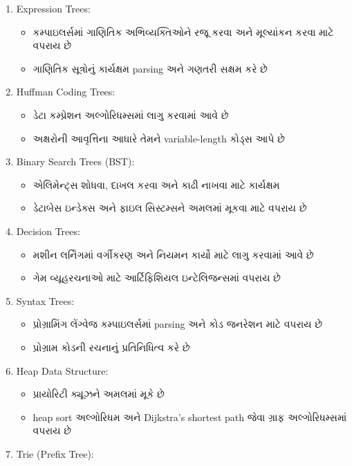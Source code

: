 \begin{enumerate}
\def\labelenumi{\arabic{enumi}.}
\tightlist
\item
  Expression Trees:

  \begin{itemize}
  \tightlist
  \item
    કમ્પાઇલર્સમાં ગાણિતિક અભિવ્યક્તિઓને રજૂ કરવા અને મૂલ્યાંકન કરવા માટે વપરાય છે
  \item
    ગાણિતિક સૂત્રોનું કાર્યક્ષમ parsing અને ગણતરી સક્ષમ કરે છે
  \end{itemize}
\item
  Huffman Coding Trees:

  \begin{itemize}
  \tightlist
  \item
    ડેટા કમ્પ્રેશન અલ્ગોરિધમ્સમાં લાગુ કરવામાં આવે છે
  \item
    અક્ષરોની આવૃત્તિના આધારે તેમને variable-length કોડ્સ આપે છે
  \end{itemize}
\item
  Binary Search Trees (BST):

  \begin{itemize}
  \tightlist
  \item
    એલિમેન્ટ્સ શોધવા, દાખલ કરવા અને કાઢી નાખવા માટે કાર્યક્ષમ
  \item
    ડેટાબેસ ઇન્ડેક્સ અને ફાઇલ સિસ્ટમ્સને અમલમાં મૂકવા માટે વપરાય છે
  \end{itemize}
\item
  Decision Trees:

  \begin{itemize}
  \tightlist
  \item
    મશીન લર્નિંગમાં વર્ગીકરણ અને નિયમન કાર્યો માટે લાગુ કરવામાં આવે છે
  \item
    ગેમ વ્યૂહરચનાઓ માટે આર્ટિફિશિયલ ઇન્ટેલિજન્સમાં વપરાય છે
  \end{itemize}
\item
  Syntax Trees:

  \begin{itemize}
  \tightlist
  \item
    પ્રોગ્રામિંગ લેંગ્વેજ કમ્પાઇલર્સમાં parsing અને કોડ જનરેશન માટે વપરાય છે
  \item
    પ્રોગ્રામ કોડની રચનાનું પ્રતિનિધિત્વ કરે છે
  \end{itemize}
\item
  Heap Data Structure:

  \begin{itemize}
  \tightlist
  \item
    પ્રાયોરિટી ક્યૂઝને અમલમાં મૂકે છે
  \item
    heap sort અલ્ગોરિધમ અને Dijkstra's shortest path જેવા ગ્રાફ અલ્ગોરિધમ્સમાં
    વપરાય છે
  \end{itemize}
\item
  Trie (Prefix Tree):


\end{enumerate}
